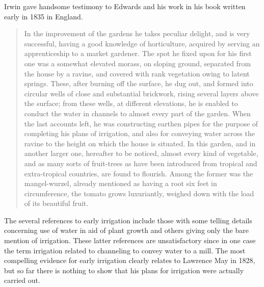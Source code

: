 Irwin gave handsome testimony to Edwards and his work in his book
written early in 1835 in England.
\begin{quote}
	In the improvement of the gardens he takes peculiar delight,
	and is very successful, having a good knowledge of
	horticulture, acquired by serving an apprenticeship to a
	market gardener.  The spot he fixed upon for his first one was
	a somewhat elevated mor\-ass, on sloping ground, separated
	from the house by a ravine, and covered with rank vegetation
	owing to latent springs.  These, after burning off the
	surface, he dug out, and formed into circular wells of close
	and substantial brickwork, rising several layers above the
	surface; from these wells, at different elevations, he is
	enabled to conduct the water in channels to almost every part
	of the garden.  When the last accounts left, he was
	constructing earthen pipes for the purpose of completing his
	plans of irrigation, and also for conveying water across the
	ravine to the height on which the house is situated.  In this
	garden, and in another larger one, hereafter to be noticed,
	almost every kind of vegetable, and as many sorts of
	fruit-trees as have been introduced from tropical and
	extra-tropical countries, are found to flourish.  Among the
	former was the mangel-wurzel, already mentioned as having a
	root six feet in circumference, the tomato grows luxuriantly,
	weighed down with the load of its beautiful
	fruit.
\end{quote}


\closure
The several references to early irrigation include those with some
telling details concerning use of water in aid of plant growth and
others giving only the bare mention of irrigation. These latter
references are unsatisfactory since in one case the term irrigation
related to channeling to convey water to a mill.  The most compelling
evidence for early irrigation clearly relates to Lawrence May in 1828,
but so far there is nothing to show that his plans for irrigation were
actually carried out.

